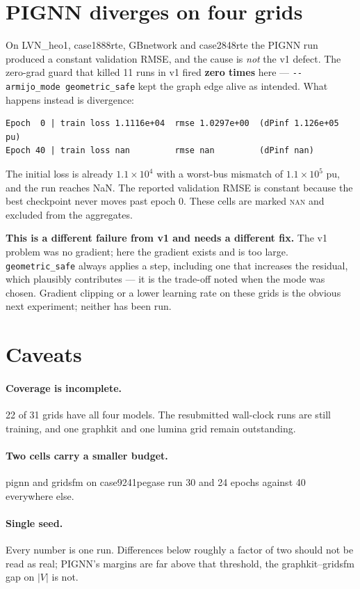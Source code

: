 \documentclass[10pt]{article}
\begin{document}
\section{PIGNN diverges on four grids}

On LVN\_heo1, case1888rte, GBnetwork and case2848rte the PIGNN run produced a
constant validation RMSE, and the cause is \emph{not} the v1 defect. The
zero-grad guard that killed 11 runs in v1 fired \textbf{zero times} here ---
\texttt{-{}-armijo\_mode geometric\_safe} kept the graph edge alive as intended.
What happens instead is divergence:

\begin{verbatim}
Epoch  0 | train loss 1.1116e+04  rmse 1.0297e+00  (dPinf 1.126e+05 pu)
Epoch 40 | train loss nan         rmse nan         (dPinf nan)
\end{verbatim}

The initial loss is already $1.1\times10^{4}$ with a worst-bus mismatch of
$1.1\times10^{5}$ pu, and the run reaches NaN. The reported validation RMSE is
constant because the best checkpoint never moves past epoch 0. These cells are
marked \textsc{nan} and excluded from the aggregates.

\textbf{This is a different failure from v1 and needs a different fix.} The v1
problem was no gradient; here the gradient exists and is too large.
\texttt{geometric\_safe} always applies a step, including one that increases the
residual, which plausibly contributes --- it is the trade-off noted when the
mode was chosen. Gradient clipping or a lower learning rate on these grids is
the obvious next experiment; neither has been run.

\section{Caveats}

\paragraph{Coverage is incomplete.} 22 of 31 grids have all four models. The
resubmitted wall-clock runs are still training, and one graphkit and one lumina
grid remain outstanding.

\paragraph{Two cells carry a smaller budget.} pignn and gridsfm on
case9241pegase run 30 and 24 epochs against 40 everywhere else.

\paragraph{Single seed.} Every number is one run. Differences below roughly a
factor of two should not be read as real; PIGNN's margins are far above that
threshold, the graphkit--gridsfm gap on $|V|$ is not.
\end{document}
